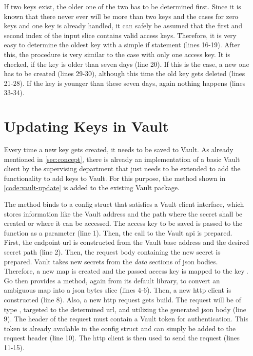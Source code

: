 If two keys exist, the older one of the two has to be determined first.
Since it is known that there never ever will be more than two keys and the cases for zero keys and one key is already handled, it can safely be assumed that the first and second index of the input slice contains valid access keys.
Therefore, it is very easy to determine the oldest key with a simple if statement (lines 16-19).
After this, the procedure is very similar to the case with only one access key.
It is checked, if the key is older than seven days (line 20).
If this is the case, a new one has to be created (lines 29-30), although this time the old key gets deleted (lines 21-28).
If the key is younger than these seven days, again nothing happens (lines 33-34).



\section{Updating Keys in Vault}
Every time a new key gets created, it needs to be saved to Vault.
As already mentioned in \autoref{sec:concept}, there is already an implementation of a basic Vault client by the supervising department that just needs to be extended to add the functionality to add keys to Vault.
For this purpose, the method shown in \autoref{code:vault-update} is added to the existing Vault package.

The method binds to a config struct that satisfies a Vault client interface, which stores information like the Vault address and the path where the secret shall be created or where it can be accessed.
The access key to be saved is passed to the function as a parameter (line 1).
Then, the call to the Vault \ac{api} is prepared.
First, the endpoint \ac{url} is constructed from the Vault base address and the desired secret path (line 2).
Then, the request body containing the new secret is prepared.
Vault takes new secrets from the \emph{data} sections of \ac{json} bodies.
Therefore, a new map is created and the passed access key is mapped to the key .
Go then provides a method, again from its default library, to convert an ambiguous map into a \ac{json} bytes slice (lines 4-6).
Then, a new \ac{http} client is constructed (line 8).
Also, a new \ac{http} request gets build.
The request will be of type , targeted to the determined \ac{url}, and utilizing the generated \ac{json} body (line 9).
The header of the request must contain a Vault token for authentication.
This token is already available in the config struct and can simply be added to the request header (line 10).
The \ac{http} client is then used to send the request (lines 11-15).


